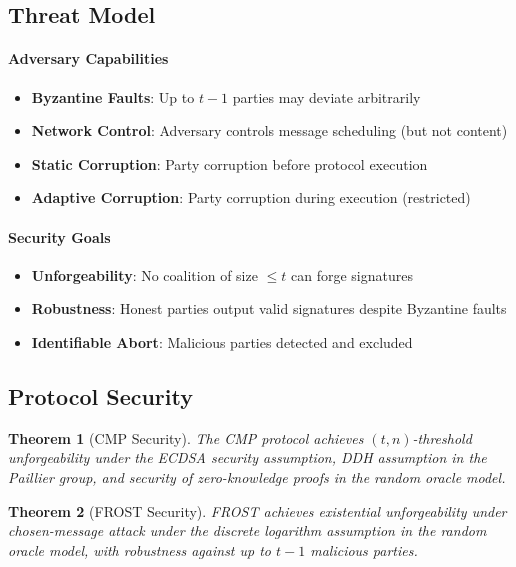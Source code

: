 \documentclass[11pt,twocolumn]{article}
\newtheorem{theorem}{Theorem}
\begin{document}
\subsection{Threat Model}

\paragraph{Adversary Capabilities}
\begin{itemize}
\item \textbf{Byzantine Faults}: Up to $t-1$ parties may deviate arbitrarily
\item \textbf{Network Control}: Adversary controls message scheduling (but not content)
\item \textbf{Static Corruption}: Party corruption before protocol execution
\item \textbf{Adaptive Corruption}: Party corruption during execution (restricted)
\end{itemize}

\paragraph{Security Goals}
\begin{itemize}
\item \textbf{Unforgeability}: No coalition of size $\leq t$ can forge signatures
\item \textbf{Robustness}: Honest parties output valid signatures despite Byzantine faults
\item \textbf{Identifiable Abort}: Malicious parties detected and excluded
\end{itemize}

\subsection{Protocol Security}

\begin{theorem}[CMP Security]
The CMP protocol achieves $(t,n)$-threshold unforgeability under the ECDSA security assumption, DDH assumption in the Paillier group, and security of zero-knowledge proofs in the random oracle model.
\end{theorem}

\begin{theorem}[FROST Security]
FROST achieves existential unforgeability under chosen-message attack under the discrete logarithm assumption in the random oracle model, with robustness against up to $t-1$ malicious parties.
\end{theorem}
\end{document}
